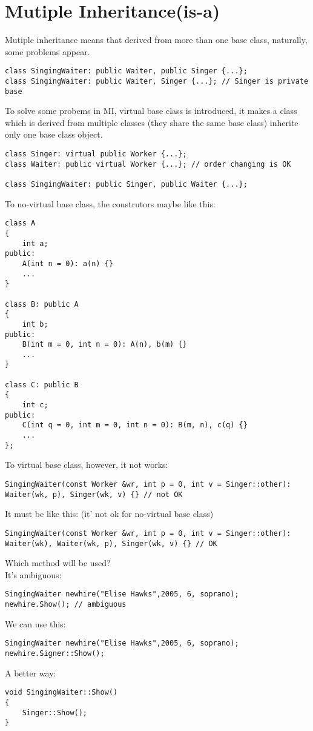\documentclass[10pt,a4paper,oneside]{article}
\begin{document}
\section{Mutiple Inheritance(is-a)}
Mutiple inheritance means that derived from more than one base class, naturally, some problems appear.
\begin{lstlisting}
class SingingWaiter: public Waiter, public Singer {...};
class SingingWaiter: public Waiter, Singer {...}; // Singer is private base
\end{lstlisting}
To solve some probems in MI, virtual base class is introduced, it makes a class which is derived from multiple classes (they share the same base class) inherite only one base class object.
\begin{lstlisting}
class Singer: virtual public Worker {...};
class Waiter: public virtual Worker {...}; // order changing is OK

class SingingWaiter: public Singer, public Waiter {...};
\end{lstlisting}
To no-virtual base class, the construtors maybe like this:
\begin{lstlisting}
class A
{
    int a;
public:
    A(int n = 0): a(n) {}
    ...
}

class B: public A
{
    int b;
public:
    B(int m = 0, int n = 0): A(n), b(m) {}
    ...
}

class C: public B
{
    int c;
public:
    C(int q = 0, int m = 0, int n = 0): B(m, n), c(q) {}
    ...
};
\end{lstlisting}
To virtual base class, however, it not works:
\begin{lstlisting}
SingingWaiter(const Worker &wr, int p = 0, int v = Singer::other): Waiter(wk, p), Singer(wk, v) {} // not OK
\end{lstlisting}
It must be like this: (it' not ok for no-virtual base class)
\begin{lstlisting}
SingingWaiter(const Worker &wr, int p = 0, int v = Singer::other): Waiter(wk), Waiter(wk, p), Singer(wk, v) {} // OK
\end{lstlisting}
Which method will be used?\\
It's ambiguous:
\begin{lstlisting}
SingingWaiter newhire("Elise Hawks",2005, 6, soprano);
newhire.Show(); // ambiguous
\end{lstlisting}
We can use this:
\begin{lstlisting}
SingingWaiter newhire("Elise Hawks",2005, 6, soprano);
newhire.Signer::Show();
\end{lstlisting}
A better way:
\begin{lstlisting}
void SingingWaiter::Show()
{
    Singer::Show();
}
\end{lstlisting}
\end{document}
